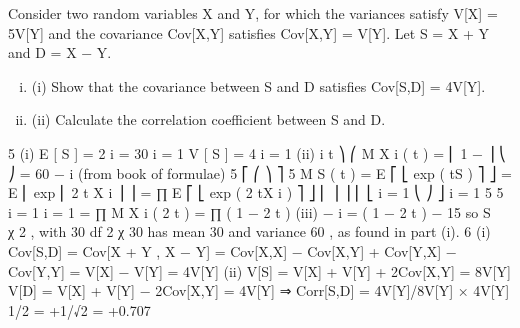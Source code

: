\documentclass[a4paper,12pt]{article}
\begin{document}

\item Consider two random variables X and Y, for which the variances satisfy V[X] = 5V[Y]
and the covariance Cov[X,Y] satisfies Cov[X,Y] = V[Y].
Let S = X + Y and D = X − Y.
\begin{enumerate}[(i)]
\item (i)  Show that the covariance between S and D satisfies Cov[S,D] = 4V[Y].
\item (ii) Calculate the correlation coefficient between S and D.
\end{enumerate}
5
(i)
E [ S ] = 2 \lambda \sum
i
= 30
i = 1 
V [ S ] = 4  \sum
i = 1
(ii)
i
t ⎞
⎛
M X i ( t ) = ⎜ 1 − ⎟
⎝ \lambda ⎠
= 60
− i
(from book of formulae)
5
⎡
⎛
⎞ ⎤ 5
M S ( t ) = E ⎡ ⎣ exp ( tS ) ⎤ ⎦ = E ⎢ exp ⎜ 2 \lambda t \sum X i ⎟ ⎥ = ∏ E ⎡ ⎣ exp ( 2 \lambda tX i ) ⎤ ⎦
⎜
⎟ ⎥
⎢ ⎣
i = 1
⎝
⎠ ⎦ i = 1
5 5
i = 1 i = 1
= ∏ M X i ( 2 \lambda t ) = ∏ ( 1 − 2 t )
(iii)
− i
= ( 1 − 2 t )
− 15
so S ~ χ 2 , with 30 df
2
χ 30
has mean 30 and variance 60 , as found in part (i).
6
(i) Cov[S,D] = Cov[X + Y , X − Y] = Cov[X,X] − Cov[X,Y] + Cov[Y,X] − Cov[Y,Y]
= V[X] − V[Y] = 4V[Y]
(ii) V[S] = V[X] + V[Y] + 2Cov[X,Y] = 8V[Y]
V[D] = V[X] + V[Y] − 2Cov[X,Y] = 4V[Y]
⇒ Corr[S,D] = 4V[Y]/{8V[Y] × 4V[Y]} 1/2 = +1/√2 = +0.707
\end{document}
